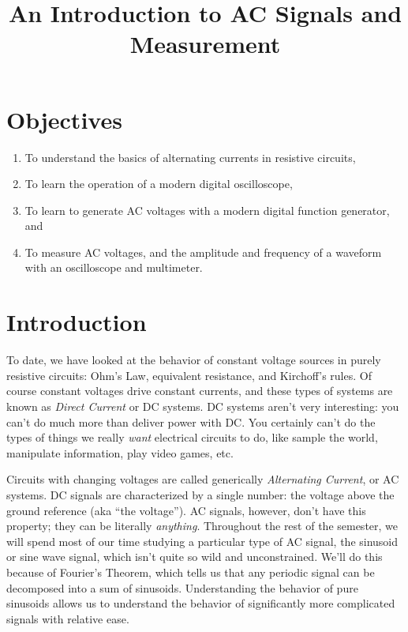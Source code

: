 \documentclass[12pt]{article}
\title{An Introduction to AC Signals and Measurement}
\author{}
\date{}
\begin{document}
\maketitle

\section{Objectives}
\label{sec:objectives}

\begin{enumerate}
\item To understand the basics of alternating currents in resistive
  circuits,
\item To learn the operation of a modern digital oscilloscope,
\item To learn to generate AC voltages with a modern digital function
  generator, and
\item To measure AC voltages, and the amplitude and frequency
  of a waveform with an oscilloscope and multimeter.
\end{enumerate}

\section{Introduction}
\label{sec:introduction}

To date, we have looked at the behavior of constant voltage sources in
purely resistive circuits: Ohm's Law, equivalent resistance, and
Kirchoff's rules.  Of course constant voltages drive constant
currents, and these types of systems are known as \textit{Direct
  Current} or DC systems.  DC systems aren't very interesting: you
can't do much more than deliver power with DC.  You certainly can't do
the types of things we really \textit{want} electrical circuits to do,
like sample the world, manipulate information, play video games, etc.

Circuits with changing voltages are called generically
\textit{Alternating Current}, or AC systems.  DC signals are
characterized by a single number: the voltage above the ground
reference (aka ``the voltage'').  AC signals, however, don't have this
property; they can be literally \textit{anything}.  Throughout the
rest of the semester, we will spend most of our time studying a
particular type of AC signal, the sinusoid or sine wave signal, which
isn't quite so wild and unconstrained.  We'll do this because of
Fourier's Theorem, which tells us that any periodic signal can be
decomposed into a sum of sinusoids.  Understanding the behavior of
pure sinusoids allows us to understand the behavior of significantly
more complicated signals with relative ease.
\end{document}
